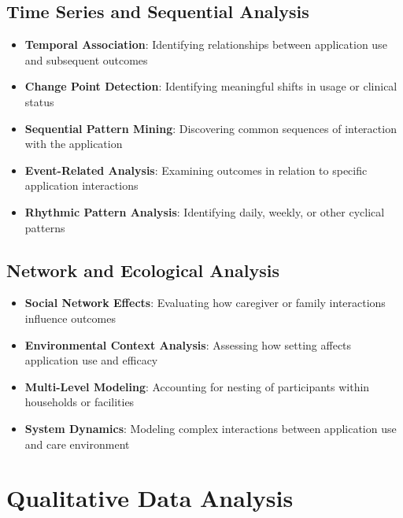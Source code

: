 \subsection{Time Series and Sequential Analysis}
\begin{itemize}
    \item \textbf{Temporal Association}: Identifying relationships between application use and subsequent outcomes
    
    \item \textbf{Change Point Detection}: Identifying meaningful shifts in usage or clinical status
    
    \item \textbf{Sequential Pattern Mining}: Discovering common sequences of interaction with the application
    
    \item \textbf{Event-Related Analysis}: Examining outcomes in relation to specific application interactions
    
    \item \textbf{Rhythmic Pattern Analysis}: Identifying daily, weekly, or other cyclical patterns
\end{itemize}

\subsection{Network and Ecological Analysis}
\begin{itemize}
    \item \textbf{Social Network Effects}: Evaluating how caregiver or family interactions influence outcomes
    
    \item \textbf{Environmental Context Analysis}: Assessing how setting affects application use and efficacy
    
    \item \textbf{Multi-Level Modeling}: Accounting for nesting of participants within households or facilities
    
    \item \textbf{System Dynamics}: Modeling complex interactions between application use and care environment
\end{itemize}

\section{Qualitative Data Analysis}
